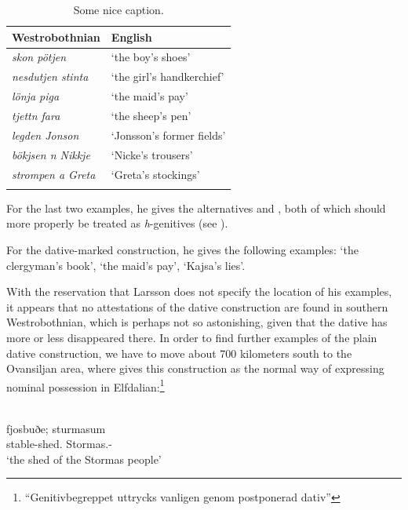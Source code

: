 \begin{table}
\begin{tabular}{ll}
\lsptoprule Westrobothnian & English \\
\midrule 
\textit{skon pötjen} & ‘the boy’s shoes’\\ 
\textit{nesdutjen stinta} & ‘the girl’s handkerchief’\\ 
\textit{lönja piga} & ‘the maid’s pay’\\ 
\textit{tjettn fara} & ‘the sheep’s pen’\\ 
\textit{legden Jonson} & ‘Jonsson’s former fields’\\ 
\textit{bökjsen n Nikkje} & ‘Nicke’s trousers’\\ 
\textit{strompen a Greta} & ‘Greta’s stockings’\\
\lspbottomrule
\end{tabular}
\caption{Some nice caption.}
\label{tab:5.1}
\end{table} 


For the last two examples, he gives the alternatives  and , both of which should more properly be treated as \textit{h}{}-genitives (see ).

For the dative-marked construction, he gives the following examples:  ‘the clergyman’s book’,  ‘the maid’s pay’, ‘Kajsa’s lies’. 

With the reservation that Larsson does not specify the location of his examples, it appears that no attestations of the dative construction are found in southern Westrobothnian, which is perhaps not so astonishing, given that the dative has more or less disappeared there. In order to find further examples of the plain dative construction, we have to move about 700 kilometers south to the Ovansiljan area, where \citet[97]{Levander1909} gives this construction as the normal way of expressing nominal possession in Elfdalian:\footnote{ “Genitivbegreppet uttrycks vanligen genom postponerad dativ”}

\ea%
\\
\gll fjosbuðe;  sturmasum\\
stable-shed.{}  Stormas.{}-{\pl}\\
\glt ‘the shed of the Stormas people’
\z

